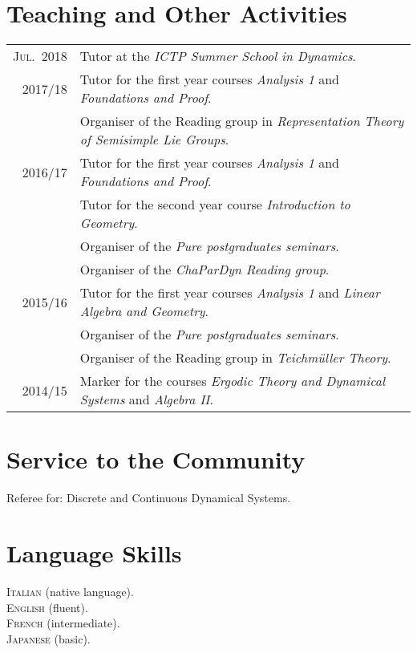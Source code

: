 \documentclass[a4paper,10pt]{article}
\begin{document}
\section{Teaching and Other Activities}
\begin{tabularx}{\linewidth}{r X}
%
\textsc{Jul.~2018} & Tutor at the \emph{ICTP Summer School in Dynamics}. \\
%
\textsc{2017/18} & Tutor for the first year courses \emph{Analysis 1} and \emph{Foundations and Proof}.\\
& Organiser of the Reading group in \emph{Representation Theory of Semisimple Lie Groups}.\\
%
\textsc{2016/17} & Tutor for the first year courses \emph{Analysis 1} and \emph{Foundations and Proof}.\\
& Tutor for the second year course \emph{Introduction to Geometry}.\\
& Organiser of the \emph{Pure postgraduates seminars}.\\
& Organiser of the \emph{ChaParDyn Reading group}.\\
%
\textsc{2015/16} & Tutor for the first year courses \emph{Analysis 1} and \emph{Linear Algebra and Geometry}.\\
& Organiser of the \emph{Pure postgraduates seminars}.\\
& Organiser of the Reading group in \emph{Teichm\"{u}ller Theory}.\\
%
\textsc{2014/15} & Marker for the courses \emph{Ergodic Theory and Dynamical Systems} and \emph{Algebra II}.\\
\end{tabularx}


\vspace{10pt}
\section{Service to the Community}
Referee for: %
Discrete and Continuous Dynamical Systems. 


\vspace{10pt}
\section{Language Skills}
\textsc{Italian} (native language).\\
\textsc{English} (fluent).\\
\textsc{French} (intermediate).\\
\textsc{Japanese} (basic).
\end{document}
